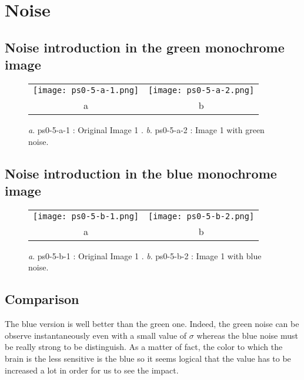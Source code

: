 \documentclass[a4paper,11pt]{article}
\begin{document}
\section{Noise}
\subsection{Noise introduction in the green monochrome image}

 \begin{figure}[H]
\begin{center}
\begin{tabular}{cc}
	\texttt{[image: ps0-5-a-1.png]}&
	\texttt{[image: ps0-5-a-2.png]}\\
	a&b\\
\end{tabular}
\end{center}
\caption{ 
\textit{a}. ps0-5-a-1 : Original Image 1  . \textit{b}. ps0-5-a-2 :  Image 1 with green noise. }
\label{ps0-5-a}
\end{figure}

\subsection{Noise introduction in the blue monochrome image}

 \begin{figure}[H]
\begin{center}
\begin{tabular}{cc}
	\texttt{[image: ps0-5-b-1.png]}&
	\texttt{[image: ps0-5-b-2.png]}\\
	a&b\\
\end{tabular}
\end{center}
\caption{ 
\textit{a}. ps0-5-b-1 : Original Image 1  . \textit{b}. ps0-5-b-2 : Image 1 with blue noise. }
\label{ps0-5-b}
\end{figure}



\subsection{Comparison}

The blue version is well better than the green one. Indeed, the green noise can be observe instantaneously even with a small value of $\sigma$ whereas the blue noise must be really strong to be distinguish. As a matter of fact, the color to which the brain is the less sensitive is the blue so it seems logical that the value has to be increased a lot in order for us to see the impact.
\end{document}
